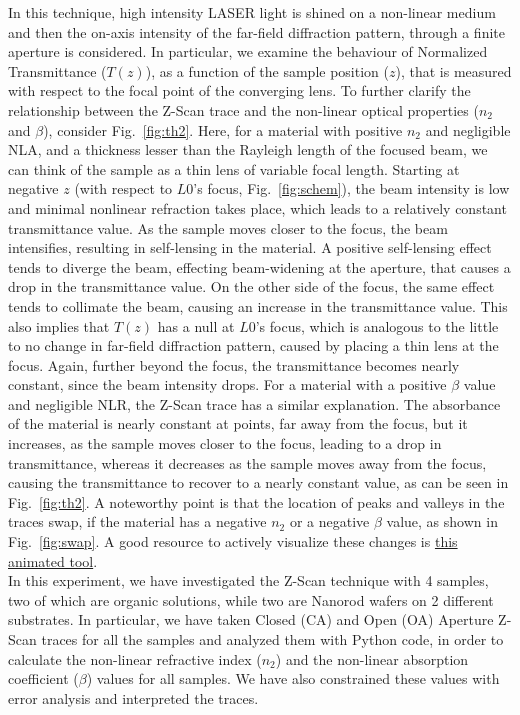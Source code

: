 \documentclass[%
 reprint,
amsmath,
amssymb,
10pt
]{revtex4-2}
\begin{document}
In this technique, high intensity LASER light is shined on a non-linear medium and then the on-axis intensity of the far-field diffraction pattern, through a finite aperture is considered. In particular, we examine the behaviour of Normalized Transmittance ($T(z)$), as a function of the sample position ($z$), that is measured with respect to the focal point of the converging lens. To further clarify the relationship between the Z-Scan trace and the non-linear optical properties ($n_2$ and $\beta$), consider Fig.~\ref{fig:th2}. Here, for a material with positive $n_2$ and negligible NLA, and a thickness lesser than the Rayleigh length of the focused beam, we can think of the sample as a thin lens of variable focal length. Starting at negative $z$ (with respect to $L0$'s focus, Fig.~\ref{fig:schem}), the beam intensity is low and minimal nonlinear refraction takes place, which leads to a relatively constant transmittance value. As the sample moves closer to the focus, the beam intensifies, resulting in self-lensing in the material. A positive self-lensing effect tends to diverge the beam, effecting beam-widening at the aperture, that causes a drop in the transmittance value. On the other side of the focus, the same effect tends to collimate the beam, causing an increase in the transmittance value. This also implies that $T(z)$ has a null at $L0$'s focus, which is analogous to the little to no change in far-field diffraction pattern, caused by placing a thin lens at the focus. Again, further beyond the focus, the transmittance becomes nearly constant, since the beam intensity drops. For a material with a positive $\beta$ value and negligible NLR, the Z-Scan trace has a similar explanation. The absorbance of the material is nearly constant at points, far away from the focus, but it increases, as the sample moves closer to the focus, leading to a drop in transmittance, whereas it decreases as the sample moves away from the focus, causing the transmittance to recover to a nearly constant value, as can be seen in Fig.~\ref{fig:th2}. A noteworthy point is that the location of peaks and valleys in the traces swap, if the material has a negative $n_2$ or a negative $\beta$ value, as shown in Fig.~\ref{fig:swap}. A good resource to actively visualize these changes is \href{http://www.phys.unm.edu/msbahae/z-scan.htm}{this animated tool}.\\

In this experiment, we have investigated the Z-Scan technique with 4 samples, two of which are organic solutions, while two are Nanorod wafers on 2 different substrates. In particular, we have taken Closed (CA) and Open (OA) Aperture Z-Scan traces for all the samples and analyzed them with Python code, in order to calculate the non-linear refractive index ($n_2$) and the non-linear absorption coefficient ($\beta$) values for all samples. We have also constrained these values with error analysis and interpreted the traces.\\
\end{document}
